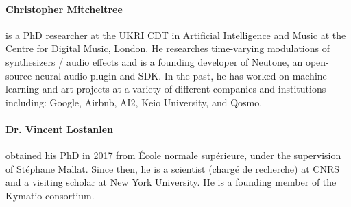 \paragraph{Christopher Mitcheltree} is a PhD researcher at the UKRI CDT in Artificial Intelligence and Music at the Centre for Digital Music, London. He researches time-varying modulations of synthesizers / audio effects and is a founding developer of Neutone, an open-source neural audio plugin and SDK. In the past, he has worked on machine learning and art projects at a variety of different companies and institutions including: Google, Airbnb, AI2, Keio University, and Qosmo.

\paragraph{Dr. Vincent Lostanlen} obtained his PhD in 2017 from École normale supérieure, under the supervision of Stéphane Mallat. Since then, he is a scientist (chargé de recherche) at CNRS and a visiting scholar at New York University. He is a founding member of the Kymatio consortium.

\clearpage
